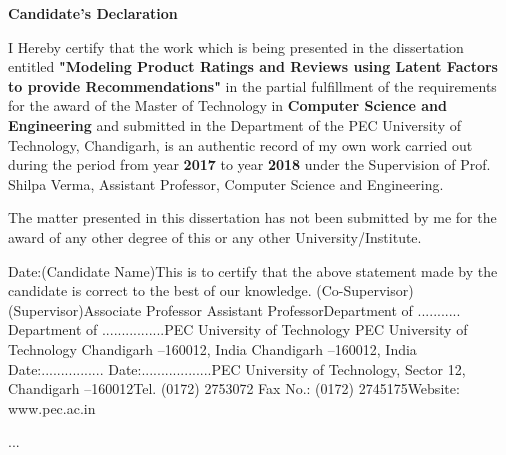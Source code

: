 \documentclass[a4paper]{article}
\begin{document}
\justify

{\color{blue}
}
\begin{large}
\begin{center}
\textbf{Candidate's Declaration}
\end{center}
I Hereby  certify  that  the  work  which  is  being  presented  in  the dissertation entitled \textbf{"Modeling Product Ratings and Reviews using Latent Factors to provide Recommendations"} in  the partial fulfillment of the requirements for the award of the Master of Technology in \textbf{Computer Science and Engineering} and submitted in the Department of the PEC University of Technology, Chandigarh, is  an  authentic record of my own work carried out during the period from year \textbf{2017} to year \textbf{2018} under the Supervision of Prof. Shilpa Verma, Assistant Professor, Computer Science and Engineering. \par
The  matter  presented  in  this dissertation has  not  been  submitted  by  me  for  the  award  of  any other degree of this or any other University/Institute. \par

Date:(Candidate Name)This  is  to  certify  that  the  above  statement  made  by  the  candidate  is  correct  to  the  best  of  our knowledge. (Co-Supervisor)(Supervisor)Associate Professor                                                         Assistant ProfessorDepartment of ...........                   Department of ................PEC University of Technology                                        PEC University of Technology                                                        Chandigarh –160012, India                                            Chandigarh –160012, India                                                                                                   Date:................                                                           Date:..................PEC University of Technology, Sector 12, Chandigarh –160012Tel. (0172) 2753072 Fax No.: (0172) 2745175Website: www.pec.ac.in

...
\end{large}
\end{document}
